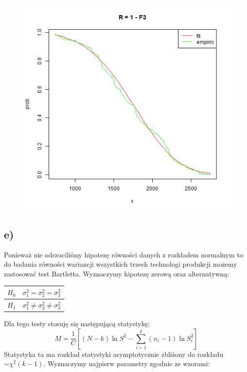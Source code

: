 \documentclass{article}
\begin{document}
\newpage
\begin{figure}[h!] \begin{center}
\includegraphics[height=0.4\textheight, angle=0]{"kolos2_R3.png"}
\end{center} \end{figure}

\subsection{e)}
Ponieważ nie odrzuciliśmy hipotezę równości danych z rozkładem normalnym to do badania równości wariancji wszystkich trzech technologi produkcji możemy zastosować test Bartletta. Wyznaczymy hipotezę zerową oraz alternatywną:
\begin{center} \begin{tabular}{|c|c|} \hline
$H_0$ & $\sigma_1^2 = \sigma_2^2 = \sigma_3^2$ \\ \hline
$H_1$ & $\sigma_1^2 \neq \sigma_2^2 \neq \sigma_3^2$ \\ \hline
\end{tabular} \end{center}

Dla tego testy stosuję się następującą statystykę:
\[ M = \frac{1}{C} \left[ (N-k)\ln{S^2} - \sum_{i=1}^k (n_i-1)\ln{S_i^2} \right] \]
Statystyka ta ma rozkład statystyki asymptotycznie zbliżony do rozkładu $\sim \chi^2(k-1)$. Wyznaczymy najpierw parametry zgodnie ze wzorami:
\end{document}
